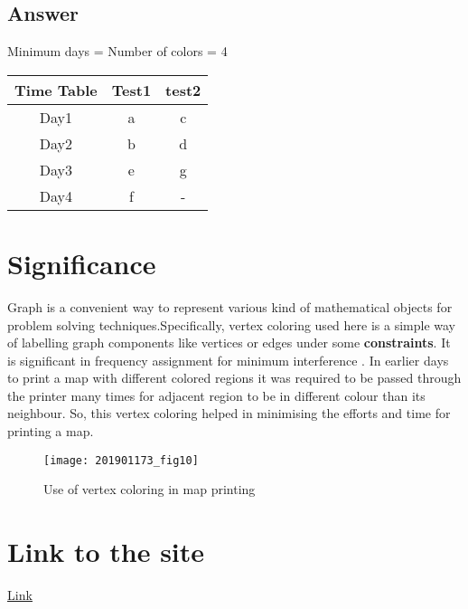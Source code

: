 \documentclass{article}
\begin{document}
\newpage

\subsection{Answer}

Minimum days = Number of colors = 4
\\
\begin{tabular}{|c|c|c|}
\hline
Time Table & Test1 & test2\\
\hline
Day1 & a & c\\
Day2 & b & d\\
Day3 & e & g\\
Day4 & f & -\\
\hline
\end{tabular}

\section{Significance}
Graph is a convenient way to represent various kind of mathematical objects for problem solving techniques.Specifically, vertex coloring used here is a simple way of labelling graph components like vertices or edges under some {\bf constraints}. It is significant in frequency assignment for minimum interference \cite{maa}. In earlier days to print a map with different colored regions it was required to be passed through the printer many times for adjacent region to be in different colour than its neighbour. So, this vertex coloring helped in minimising the efforts and time for printing a map.


\begin{figure}[h]
    \texttt{[image: 201901173\_fig10]}
    \caption{Use of vertex coloring in map printing}
    \label{fig:201901173_fig10}
\end{figure}

\section{Link to the site}
\href{https://sites.google.com/view/201901173/home}{\underline{Link}}



\end{document}

